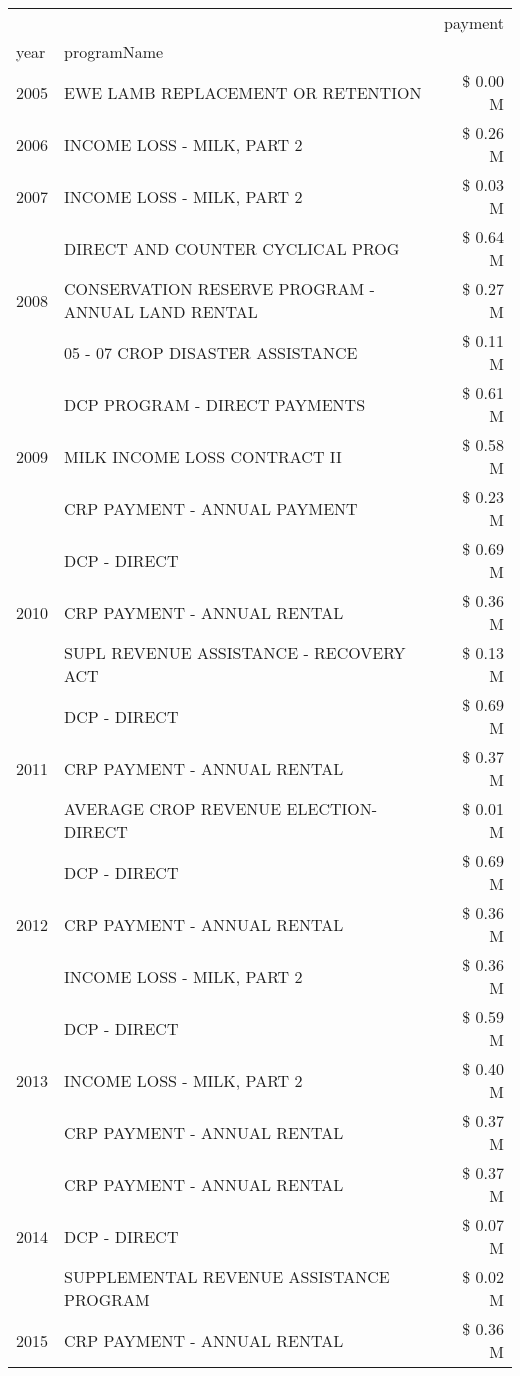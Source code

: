 \begin{tabular}{llr}
\toprule
 &  & payment \\
year & programName &  \\
\midrule
2005 & EWE LAMB REPLACEMENT OR RETENTION & \$ 0.00 M \\
\cline{1-3}
2006 & INCOME LOSS - MILK, PART 2 & \$ 0.26 M \\
\cline{1-3}
2007 & INCOME LOSS - MILK, PART 2 & \$ 0.03 M \\
\cline{1-3}
\multirow[t]{3}{*}{2008} & DIRECT AND COUNTER CYCLICAL PROG & \$ 0.64 M \\
 & CONSERVATION RESERVE PROGRAM - ANNUAL LAND RENTAL & \$ 0.27 M \\
 & 05 - 07 CROP DISASTER ASSISTANCE & \$ 0.11 M \\
\cline{1-3}
\multirow[t]{3}{*}{2009} & DCP PROGRAM - DIRECT PAYMENTS & \$ 0.61 M \\
 & MILK INCOME LOSS CONTRACT II & \$ 0.58 M \\
 & CRP PAYMENT - ANNUAL PAYMENT & \$ 0.23 M \\
\cline{1-3}
\multirow[t]{3}{*}{2010} & DCP - DIRECT & \$ 0.69 M \\
 & CRP PAYMENT - ANNUAL RENTAL & \$ 0.36 M \\
 & SUPL REVENUE ASSISTANCE - RECOVERY ACT & \$ 0.13 M \\
\cline{1-3}
\multirow[t]{3}{*}{2011} & DCP - DIRECT & \$ 0.69 M \\
 & CRP PAYMENT - ANNUAL RENTAL & \$ 0.37 M \\
 & AVERAGE CROP REVENUE ELECTION-DIRECT & \$ 0.01 M \\
\cline{1-3}
\multirow[t]{3}{*}{2012} & DCP - DIRECT & \$ 0.69 M \\
 & CRP PAYMENT - ANNUAL RENTAL & \$ 0.36 M \\
 & INCOME LOSS - MILK, PART 2 & \$ 0.36 M \\
\cline{1-3}
\multirow[t]{3}{*}{2013} & DCP - DIRECT & \$ 0.59 M \\
 & INCOME LOSS - MILK, PART 2 & \$ 0.40 M \\
 & CRP PAYMENT - ANNUAL RENTAL & \$ 0.37 M \\
\cline{1-3}
\multirow[t]{3}{*}{2014} & CRP PAYMENT - ANNUAL RENTAL & \$ 0.37 M \\
 & DCP - DIRECT & \$ 0.07 M \\
 & SUPPLEMENTAL REVENUE ASSISTANCE PROGRAM & \$ 0.02 M \\
\cline{1-3}
\multirow[t]{2}{*}{2015} & CRP PAYMENT - ANNUAL RENTAL & \$ 0.36 M \\

\end{tabular}
